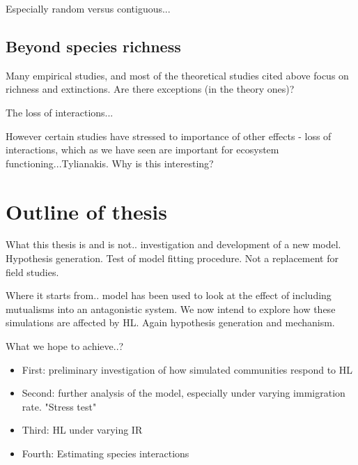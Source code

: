 Especially random versus contiguous...

\subsection{Beyond species richness}
\label{sec:intro_beyond}

Many empirical studies, and most of the theoretical studies cited above focus on richness and extinctions. Are there exceptions (in the theory ones)?

The loss of interactions...

However certain studies have stressed to importance of other effects - loss of interactions, which as we have seen are important for ecosystem functioning...Tylianakis. Why is this interesting?

\section{Outline of thesis}
\label{sec:intro_outline}

What this thesis is and is not.. investigation and development of a new model. Hypothesis generation. Test of model fitting procedure. Not a replacement for field studies.

Where it starts from.. model has been used to look at the effect of including mutualisms into an antagonistic system. We now intend to explore how these simulations are affected by HL. Again hypothesis generation and mechanism.

What we hope to achieve..?

\begin{itemize}
	\item First: preliminary investigation of how simulated communities respond to HL
	\item Second: further analysis of the model, especially under varying immigration rate. "Stress test"
	\item Third: HL under varying IR
	\item Fourth: Estimating species interactions
\end{itemize}


